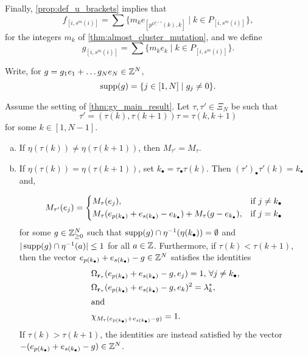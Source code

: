 Finally, \cref{prop:def_u_brackets} implies that
\begin{equation*}
	f_{[i, s^m(i)]} = \sum\{m_k e_{[p^{O^{i+1}_{-}}(k), k]} \mid k \in P_{[i, s^m(i)]}\},
\end{equation*}
for the integers $m_k$ of \cref{thm:almost_cluster_mutation}, and we define
\begin{equation*}
	g_{[i, s^m(i)]} = \sum\{m_k e_k \mid k \in P_{[i, s^m(i)]}\}.
\end{equation*}

Write, for $g = g_1e_1 + \dots g_N e_N \in \mathbb{Z}^N$,
\begin{equation*}
	\operatorname{supp}(g) = \{j \in [1, N] \mid g_j \neq 0\}.
\end{equation*}

\begin{proposition}\label{prop:mutation_adjacent_permutations}
	Assume the setting of \cref{thm:gy_main_result}. Let $\tau, \tau' \in \Xi_N$ be such that
	\begin{equation*}
		\tau' = (\tau(k), \tau(k+1))\tau = \tau(k, k+1)
	\end{equation*}
	for some $k \in [1, N-1]$.
	\begin{enumerate}[(a)]
		\item If $\eta(\tau(k)) \neq \eta(\tau(k + 1))$, then $M_{\tau'} = M_\tau$.
		\item If $\eta(\tau(k)) = \eta(\tau(k+1))$, set $k_\bullet = \tau_\bullet\tau(k)$. Then
		      $(\tau')_\bullet\tau'(k) = k_\bullet$ and,

		      \begin{equation*}
			      M_{\tau'}(e_j) = \begin{dcases*}
				      M_{\tau}(e_j),                                                                         & if $j \neq k_\bullet$ \\
				      M_\tau(e_{p(k_\bullet)} + e_{s(k_\bullet)} - e_{k_\bullet}) + M_\tau(g-e_{k_\bullet}), & if $j =k_\bullet$
			      \end{dcases*}
		      \end{equation*}
		      for some $g \in \mathbb{Z}^N_{\geq 0}$ such that $\operatorname{supp}(g)\cap \eta^{-1}(\eta(k_\bullet)) = \emptyset$ and $|\operatorname{supp}(g)\cap \eta ^{-1} (a)| \leq 1$ for all $a \in \mathbb{Z}$. Furthermore, if $\tau(k) < \tau(k +1)$, then the vector $e_{p(k_\bullet)} + e_{s(k_\bullet)} - g \in \mathbb{Z}^N$ satisfies the identities
		      \begin{align*}
			       & \Omega_{\mathbf{r}_\tau}(e_{p(k_\bullet)} + e_{s(k_\bullet)} - g, e_j) = 1, \, \forall j \neq k_\bullet, \\
			       & \Omega_{\mathbf{r}_\tau}(e_{p(k_\bullet)} + e_{s(k_\bullet)} - g, e_k)^2 = \lambda^*_k,                  \\
			      \shortintertext{and}
			       & \chi_{M_\tau(e_{p(k_\bullet)} + e_{s(k_\bullet)} - g)} = 1.
		      \end{align*}
		      If $\tau(k) > \tau(k+1)$, the identities are instead satisfied by the vector
		      $-(e_{p(k_\bullet)} + e_{s(k_\bullet)} -g) \in \mathbb{Z}^N$.
	\end{enumerate}
\end{proposition}

